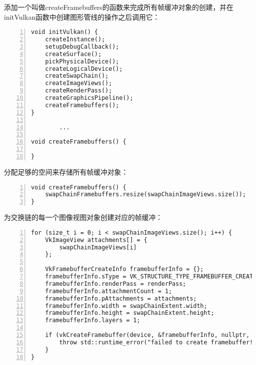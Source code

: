 \documentclass{ctexart}
\begin{document}
添加一个叫做createFramebuffers的函数来完成所有帧缓冲对象的创建，并在initVulkan函数中创建图形管线的操作之后调用它：

\begin{lstlisting}[language={[ANSI]C},keywordstyle=\color{blue!70},commentstyle=\color{red!50!green!50!blue!50},frame=shadowbox, rulesepcolor=\color{red!20!green!20!blue!20},basicstyle=\small,numbers=left, numberstyle=\tiny,breaklines=true]
void initVulkan() {
	createInstance();
	setupDebugCallback();
	createSurface();
	pickPhysicalDevice();
	createLogicalDevice();
	createSwapChain();
	createImageViews();
	createRenderPass();
	createGraphicsPipeline();
	createFramebuffers();
}

		...

void createFramebuffers() {

}
\end{lstlisting}

分配足够的空间来存储所有帧缓冲对象：

\begin{lstlisting}[language={[ANSI]C},keywordstyle=\color{blue!70},commentstyle=\color{red!50!green!50!blue!50},frame=shadowbox, rulesepcolor=\color{red!20!green!20!blue!20},basicstyle=\small,numbers=left, numberstyle=\tiny,breaklines=true]
void createFramebuffers() {
	swapChainFramebuffers.resize(swapChainImageViews.size());
}
\end{lstlisting}

为交换链的每一个图像视图对象创建对应的帧缓冲：

\begin{lstlisting}[language={[ANSI]C},keywordstyle=\color{blue!70},commentstyle=\color{red!50!green!50!blue!50},frame=shadowbox, rulesepcolor=\color{red!20!green!20!blue!20},basicstyle=\small,numbers=left, numberstyle=\tiny,breaklines=true]
for (size_t i = 0; i < swapChainImageViews.size(); i++) {
	VkImageView attachments[] = {
		swapChainImageViews[i]
	};

	VkFramebufferCreateInfo framebufferInfo = {};
	framebufferInfo.sType = VK_STRUCTURE_TYPE_FRAMEBUFFER_CREATE_INFO;
	framebufferInfo.renderPass = renderPass;
	framebufferInfo.attachmentCount = 1;
	framebufferInfo.pAttachments = attachments;
	framebufferInfo.width = swapChainExtent.width;
	framebufferInfo.height = swapChainExtent.height;
	framebufferInfo.layers = 1;

	if (vkCreateFramebuffer(device, &framebufferInfo, nullptr, &swapChainFramebuffers[i]) != VK_SUCCESS) {
		throw std::runtime_error("failed to create framebuffer!");
	}
}
\end{lstlisting}
\end{document}
